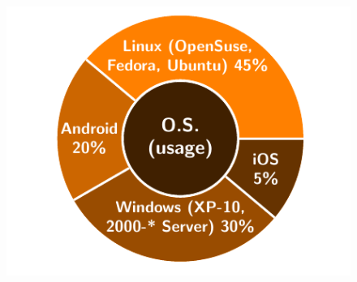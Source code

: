 \begin{figure}[!htb]
\includegraphics[scale=0.834]{resume/pie_charts/pie_chart_operative_systems.pdf}
\end{figure}


